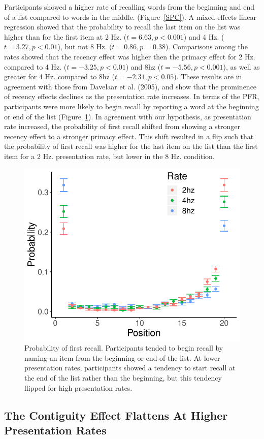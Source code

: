 \documentclass[10pt,letterpaper]{article}
\begin{document}
Participants showed a higher rate of recalling words from the beginning and end of a list compared to words in the middle. (Figure~\ref{SPC}). A mixed-effects linear regression showed that the probability to recall the last item on the list was higher than for the first item at 2 Hz. ($t = 6.63, p < 0.001$) and 4 Hz. ($t = 3.27, p < 0.01$), but not 8 Hz. ($t = 0.86, p = 0.38$). Comparisons among the rates showed that the recency effect was higher then the primacy effect for 2 Hz. compared to 4 Hz. ($t = -3.25, p < 0.01$) and 8hz ($t = -5.56, p < 0.001$), as well as greater for 4 Hz. compared to 8hz ($t = -2.31, p < 0.05$). %
These results are in agreement with those from Davelaar et al. (2005), and show that the prominence of recency effects declines as the presentation rate increases. In terms of the PFR, participants were more likely to begin recall by reporting a word at the beginning or end of the list (Figure~\ref{PFR}). In agreement with our hypothesis, as presentation rate increased, the probability of first recall shifted from showing a stronger recency effect to a stronger primacy effect. This shift resulted in a flip such that the probability of first recall was higher for the last item on the list than the first item for a 2 Hz. presentation rate, but lower in the 8 Hz. condition.
\nocite{DaveEtal05}

\begin{figure}[H]
\begin{center}
\includegraphics[width = .4\textwidth]{PFR_adjusted.pdf}
\end{center}
\caption{Probability of first recall. Participants tended to begin recall by naming an item from the beginning or end of the list. At lower presentation rates, participants showed a tendency to start recall at the end of the list rather than the beginning, but this tendency flipped for high presentation rates.} 
\label{PFR}
\end{figure}

\subsection{The Contiguity Effect Flattens At Higher Presentation Rates}
\end{document}
